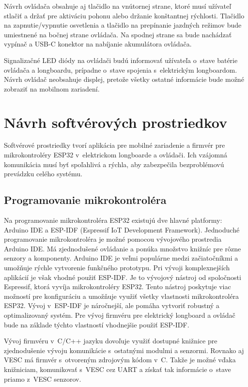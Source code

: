 Návrh ovládača obsahuje aj tlačidlo na vnútornej strane, ktoré musí užívateľ stlačiť a držať pre aktiváciu pohonu alebo držanie konštantnej rýchlosti.
Tlačidlo na zapnutie/vypnutie osvetlenia a tlačidlo na prepínanie jazdných režimov bude umiestnené na bočnej strane ovládača.
Na spodnej strane sa bude nachádzať vypínač a USB-C konektor na nabíjanie akumulátora ovládača. 

Signalizačné LED diódy na ovládači budú informovať užívateľa o~stave batérie ovládača a longboardu, prípadne o~stave spojenia s~elektrickým longboardom.
Návrh ovládač neobsahuje displej, pretože všetky ostatné informácie bude možné zobraziť na mobilnom zariadení.

\section{Návrh softvérových prostriedkov}

Softvérové prostriedky tvorí aplikácia pre mobilné zariadenie a firmvér pre mikrokontroléry ESP32 v~elektrickom longboarde a ovládači.
Ich vzájomná komunikácia musí byť spoľahlivá a rýchla, aby zabezpečila bezproblémovú prevádzku celého systému.

\subsection{Programovanie mikrokontroléra}

Na programovanie mikrokontroléra ESP32 existujú dve hlavné platformy: Arduino IDE a ESP-IDF (Espressif IoT Development Framework).
Jednoduché programovanie mikrokontroléra je možné pomocou vývojového prostredia Arduino IDE.
Má zjednodušené ovládanie a ponúka množstvo knižníc pre rôzne senzory a komponenty.
Arduino IDE je veľmi populárne medzi začiatočníkmi a umožňuje rýchle vytvorenie funkčného prototypu.\cite{Arduino}
Pri vývoji komplexnejších aplikácií je však vhodné použiť ESP-IDF.
Je to vývojový nástroj od spoločnosti Espressif, ktorá vyvíja mikrokontroléry ESP32.
Tento nástroj poskytuje viac možností pre konfiguráciu a umožňuje využiť všetky vlastnosti mikrokontroléra ESP32.
Vývoj v~ESP-IDF je náročnejší, ale pomáha vytvoriť robustný a optimalizovaný systém.\cite{EspressifIDF}
Pre vývoj firmvéru pre elektrický longboard a ovládač bude na základe týchto vlastností vhodnejšie použiť ESP-IDF.

Vývoj firmvéru v~C/C++ jazyku dovoľuje využiť dostupné knižnice pre zjednodušenie vývoju komunikácie s~ostatnými modulmi a senzormi. 
Rovnako aj VESC má firmvér s~otvoreným zdrojovým kódom v~C.
Takže je možné vďaka knižniciam, komunikovať s~VESC cez UART a získať tak informácie o~stave priamo z~VESC senzorov.

